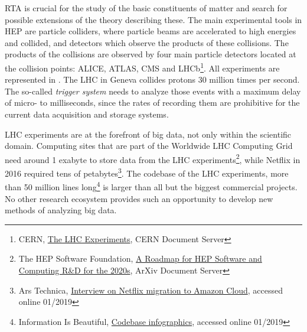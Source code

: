 RTA is crucial for the study of the basic constituents of matter and search for possible extensions of the theory describing these. 
The main experimental tools in HEP are particle colliders, where particle beams are accelerated to high energies and collided, and detectors which observe the products of these collisions. 
The products of the collisions are observed by four main particle detectors located at the collision points: ALICE, ATLAS, CMS and LHCb\footnote{CERN, \href{http://cds.cern.ch/record/1997374}{The LHC Experiments}, CERN Document Server}.
All experiments are represented in \acronym. 
The LHC in Geneva collides protons 30 million times per second.
The so-called \textit{trigger system} needs to analyze those events with a maximum delay of micro- to milliseconds, since the rates of recording them are prohibitive for the current data acquisition and storage systems. 


LHC experiments are at the forefront of big data, not only within the scientific domain.
Computing sites that are part of the Worldwide LHC Computing Grid need around 1 exabyte to store data from the LHC experiments\footnote{The HEP Software Foundation, \href{https://arxiv.org/pdf/1712.06982.pdf}{A Roadmap for HEP Software and Computing R\&D for the 2020s}, ArXiv Document Server}, while Netflix in 2016 required tens of petabytes\footnote{Ars Technica, \href{https://arstechnica.com/information-technology/2016/02/netflix-finishes-its-massive-migration-to-the-amazon-cloud/}{Interview on Netflix migration to Amazon Cloud}, accessed online 01/2019}. 
The codebase of the LHC experiments, more than 50 million lines long\footnote{Information Is Beautiful, \href{http://www.informationisbeautiful.net/visualizations/million-lines-of-code/}{Codebase infographics}, accessed online 01/2019} is larger than all but the biggest commercial projects.  
No other research ecosystem provides such an opportunity to develop new methods of analyzing big data. 

